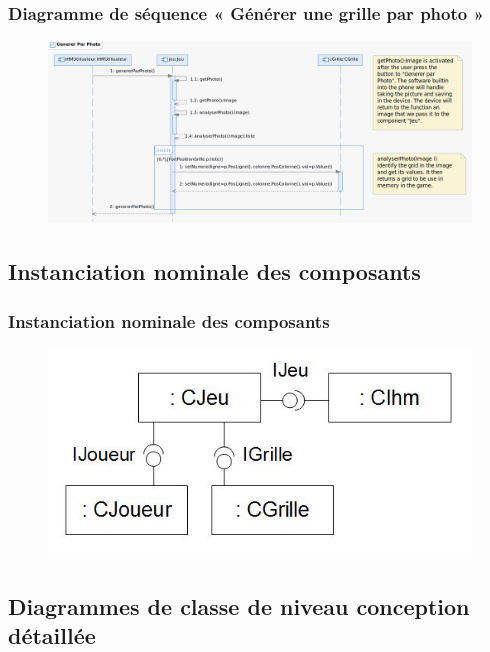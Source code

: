 \documentclass{beamer}
\begin{document}
\begin{frame}
  \frametitle{Diagramme de séquence « Générer une grille par photo »}
  \begin{figure}[h]
    \includegraphics[scale=0.3]{diagrammeSequence_03.png}
  \end{figure}
\end{frame}


\subsection{Instanciation nominale des composants}
\begin{frame}
\frametitle{Instanciation nominale des composants}
  \begin{figure}[h]
    \includegraphics[scale=0.6]{diagramme_instanciation_nominale.JPG}
  \end{figure}
\end{frame}

\subsection{Diagrammes de classe de niveau conception détaillée}
\end{document}
